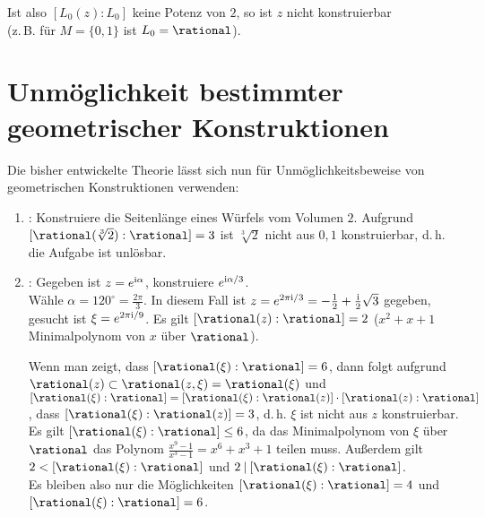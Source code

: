 \begin{Bem}
    Ist also $[L_0(z):L_0]$ keine Potenz von $2$, so ist $z$ nicht
    konstruierbar\\
    (z.\,B. für $M = \{0, 1\}$ ist $L_0 = \rational$).
\end{Bem}

\pagebreak

\section{%
    Unmöglichkeit bestimmter geometrischer Konstruktionen%
}

\begin{Bem}
    Die bisher entwickelte Theorie lässt sich nun für
    Unmöglichkeitsbeweise von geometrischen Konstruktionen verwenden:
    \begin{enumerate}
        \item
        :
        Konstruiere die Seitenlänge eines Würfels vom Volumen $2$.
        Aufgrund $[\rational(\sqrt[3]{2}):\rational] = 3$ ist
        $\sqrt[3]{2}$ nicht aus $0, 1$ konstruierbar, d.\,h.
        die Aufgabe ist unlösbar.

        \item
        :
        Gegeben ist $z = e^{\text{i}\alpha}$, konstruiere $e^{\text{i}\alpha/3}$.\\
        Wähle $\alpha = 120^\circ = \frac{2\pi}{3}$.
        In diesem Fall ist
        $z = e^{2\pi\text{i}/3} = -\frac{1}{2} + \frac{\text{i}}{2} \sqrt{3}$ gegeben,
        gesucht ist $\xi = e^{2\pi\text{i}/9}$.
        Es gilt $[\rational(z):\rational] = 2$
        ($x^2 + x + 1$ Minimalpolynom von $x$ über $\rational$).

        Wenn man zeigt, dass $[\rational(\xi):\rational] = 6$,
        dann folgt aufgrund
        $\rational(z) \subset \rational(z, \xi) = \rational(\xi)$ und\\
        $[\rational(\xi):\rational] =
        [\rational(\xi):\rational(z)] \cdot [\rational(z):\rational]$,
        dass $[\rational(\xi):\rational(z)] = 3$,
        d.\,h. $\xi$ ist nicht aus $z$ konstruierbar.
        Es gilt $[\rational(\xi):\rational] \le 6$, da
        das Minimalpolynom von $\xi$ über $\rational$
        das Polynom $\frac{x^9 - 1}{x^3 - 1} = x^6 + x^3 + 1$ teilen muss.
        Außerdem gilt $2 < [\rational(\xi):\rational]$
        und $2 \teilt [\rational(\xi):\rational]$.\\
        Es bleiben also nur die Möglichkeiten
        $[\rational(\xi):\rational] = 4$ und
        $[\rational(\xi):\rational] = 6$.


\end{enumerate}
\end{Bem}
